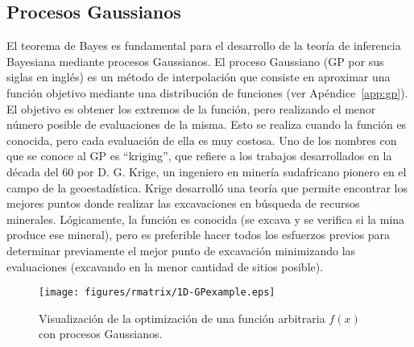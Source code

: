 \subsection{Procesos Gaussianos}

El teorema de Bayes es fundamental para el desarrollo de la teoría de 
inferencia Bayesiana mediante procesos Gaussianos. 
El proceso Gaussiano (GP por sus siglas en inglés) es un método de 
interpolación que consiste en aproximar una función objetivo mediante 
una distribución de funciones (ver Apéndice~\ref{app:gp}). El objetivo 
es obtener los extremos de la función, pero realizando el menor número 
posible de evaluaciones de la misma. Esto se realiza cuando la función 
es conocida, pero cada evaluación de ella es muy costosa. Uno de los 
nombres con que se conoce al GP es ``kriging'', que refiere a los 
trabajos desarrollados en la década del 60 por D. G. Krige, un ingeniero 
en minería sudafricano pionero en el campo de la geoestadística. Krige 
desarrolló una teoría que permite encontrar los mejores puntos donde 
realizar las excavaciones en búsqueda de recursos minerales. 
Lógicamente, la función es conocida (se excava y se verifica si la mina 
produce ese mineral), pero es preferible hacer todos los esfuerzos 
previos para determinar previamente el mejor punto de excavación 
minimizando las evaluaciones (excavando en la menor cantidad de sitios 
posible).

\begin{figure}
\centering
\texttt{[image: figures/rmatrix/1D-GPexample.eps]} 
\caption{Visualización de la optimización de una función arbitraria 
$f(x)$ con procesos Gaussianos.}
\label{fig:visualizacion-gp}
\end{figure}

